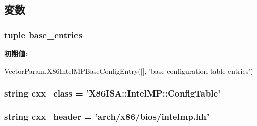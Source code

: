 \subsection{変数}
\hypertarget{classIntelMP_1_1X86IntelMPConfigTable_a605854af6244214f5ee998d69f168d79}{
\subsubsection[{base\_\-entries}]{\setlength{\rightskip}{0pt plus 5cm}tuple {\bf base\_\-entries}}}
\label{classIntelMP_1_1X86IntelMPConfigTable_a605854af6244214f5ee998d69f168d79}
{\bfseries 初期値:}
\begin{DoxyCode}
VectorParam.X86IntelMPBaseConfigEntry([],
            'base configuration table entries')
\end{DoxyCode}
\hypertarget{classIntelMP_1_1X86IntelMPConfigTable_a58cd55cd4023648e138237cfc0822ae3}{
\subsubsection[{cxx\_\-class}]{\setlength{\rightskip}{0pt plus 5cm}string {\bf cxx\_\-class} = '{\bf X86ISA::IntelMP::ConfigTable}'}}
\label{classIntelMP_1_1X86IntelMPConfigTable_a58cd55cd4023648e138237cfc0822ae3}
\hypertarget{classIntelMP_1_1X86IntelMPConfigTable_a17da7064bc5c518791f0c891eff05fda}{
\subsubsection[{cxx\_\-header}]{\setlength{\rightskip}{0pt plus 5cm}string {\bf cxx\_\-header} = 'arch/x86/bios/intelmp.hh'}}
\label{classIntelMP_1_1X86IntelMPConfigTable_a17da7064bc5c518791f0c891eff05fda}


